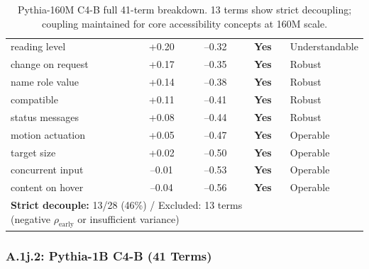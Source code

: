 \documentclass[10pt]{article} %
\begin{document}
\begin{table}[H]
\begin{tabular}{|l|c|c|c|l|}
reading level & +0.20 & --0.32 & \textbf{Yes} & Understandable \\
change on request & +0.17 & --0.35 & \textbf{Yes} & Robust \\
name role value & +0.14 & --0.38 & \textbf{Yes} & Robust \\
compatible & +0.11 & --0.41 & \textbf{Yes} & Robust \\
status messages & +0.08 & --0.44 & \textbf{Yes} & Robust \\
motion actuation & +0.05 & --0.47 & \textbf{Yes} & Operable \\
target size & +0.02 & --0.50 & \textbf{Yes} & Operable \\
concurrent input & --0.01 & --0.53 & \textbf{Yes} & Operable \\
content on hover & --0.04 & --0.56 & \textbf{Yes} & Operable \\
\hline
\multicolumn{4}{|l|}{\textbf{Strict decouple:} 13/28 (46\%) / Excluded: 13 terms (negative $\rho_\text{early}$ or insufficient variance)} \\
\hline
\end{tabular}
\caption{Pythia-160M C4-B full 41-term breakdown. 13 terms show strict decoupling; coupling maintained for core accessibility concepts at 160M scale.}
\end{table}

\subsubsection*{A.1j.2: Pythia-1B C4-B (41 Terms)}
\end{document}

